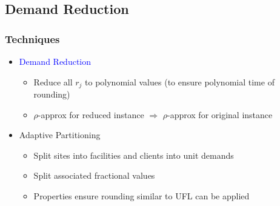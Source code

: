 \documentclass[hyperref,dvipsnames,svgnames,compress]{beamer}
\begin{document}
\subsection[Demand Reduction]{Demand Reduction}
\begin{frame}
  \frametitle{Techniques}
  \begin{itemize}\addtolength{\itemsep}{1\baselineskip}

  \item<1> {\Large \textcolor{blue}{Demand Reduction}}
    \vspace{.1in}
    \begin{itemize}\addtolength{\itemsep}{1\baselineskip}
    \item  {\large Reduce all $r_j$ to polynomial values (to ensure polynomial time of
						rounding)}
    \item  {\large $\rho$-approx for reduced instance $\Rightarrow$ $\rho$-approx for original instance }
    \end{itemize}
    
  \item<0> {\Large {Adaptive Partitioning}}
    \vspace{.1in}
    \begin{itemize}\addtolength{\itemsep}{1\baselineskip}
    \item {\large Split sites into facilities and clients into unit demands}
    \item {\large Split associated fractional values}
    \item {\large Properties ensure rounding similar to UFL can be applied}
    \end{itemize}
  \end{itemize}
\end{frame}
\end{document}

